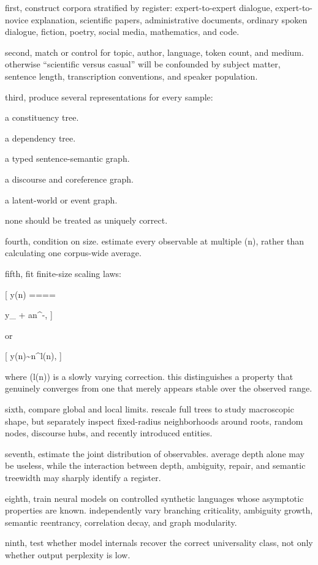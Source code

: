 first, construct corpora stratified by register: expert-to-expert dialogue, expert-to-novice explanation, scientific papers, administrative documents, ordinary spoken dialogue, fiction, poetry, social media, mathematics, and code.

second, match or control for topic, author, language, token count, and medium. otherwise “scientific versus casual” will be confounded by subject matter, sentence length, transcription conventions, and speaker population.

third, produce several representations for every sample:

a constituency tree.

a dependency tree.

a typed sentence-semantic graph.

a discourse and coreference graph.

a latent-world or event graph.

none should be treated as uniquely correct.

fourth, condition on size. estimate every observable at multiple (n), rather than calculating one corpus-wide average.

fifth, fit finite-size scaling laws:

[
y(n)
====

y_\infty
+
an^{-\omega},
]

or

[
y(n)\sim n^\beta l(n),
]

where (l(n)) is a slowly varying correction. this distinguishes a property that genuinely converges from one that merely appears stable over the observed range.

sixth, compare global and local limits. rescale full trees to study macroscopic shape, but separately inspect fixed-radius neighborhoods around roots, random nodes, discourse hubs, and recently introduced entities.

seventh, estimate the joint distribution of observables. average depth alone may be useless, while the interaction between depth, ambiguity, repair, and semantic treewidth may sharply identify a register.

eighth, train neural models on controlled synthetic languages whose asymptotic properties are known. independently vary branching criticality, ambiguity growth, semantic reentrancy, correlation decay, and graph modularity.

ninth, test whether model internals recover the correct universality class, not only whether output perplexity is low.

